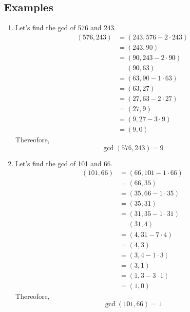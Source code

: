 \documentclass[11pt, draft]{article}
\begin{document}
\subsection{Examples}
\begin{enumerate}
    \item Let's find the gcd of 576 and 243.\begin{align*}
              (576, 243) & = (243, 576 - 2 \cdot 243) \\
                         & = (243, 90)                \\
                         & = (90, 243 - 2 \cdot 90)   \\
                         & = (90, 63)                 \\
                         & = (63, 90 - 1 \cdot 63)    \\
                         & = (63, 27)                 \\
                         & = (27, 63 - 2 \cdot 27)    \\
                         & = (27, 9)                  \\
                         & = (9, 27 - 3 \cdot 9)      \\
                         & = (9, 0)
          \end{align*}
          Thereofore,
          \[
              \gcd(576,243) = 9
          \]

    \item Let's find the gcd of 101 and 66.
          \begin{align*}
              (101, 66) & = (66, 101 - 1 \cdot 66) \\
                        & = (66, 35)               \\
                        & = (35, 66 - 1 \cdot 35)  \\
                        & = (35, 31)               \\
                        & = (31, 35 - 1 \cdot 31)  \\
                        & = (31, 4)                \\
                        & = (4, 31 - 7 \cdot 4)    \\
                        & = (4, 3)                 \\
                        & = (3, 4 - 1 \cdot 3)     \\
                        & = (3, 1)                 \\
                        & = (1, 3 - 3 \cdot 1)     \\
                        & = (1, 0)
          \end{align*}
          Thereofore,
          \[
              \gcd(101,66) = 1
          \]


\end{enumerate}
\end{document}
